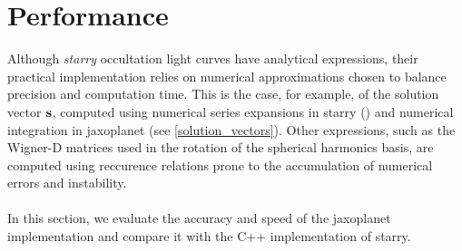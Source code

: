 \documentclass[modern]{aastex631}
\begin{document}
\newpage
\section{Performance}\label{performances}
Although \textit{starry} occultation light curves have analytical expressions, their practical implementation relies on numerical approximations chosen to balance precision and computation time. This is the case, for example, of the solution vector ${\mathbf{s}}$, computed using numerical series expansions in \textsf{starry} (\citealt[section D.2.3]{starry}) and numerical integration in \textsf{jaxoplanet} (see \autoref{solution_vectors}). Other expressions, such as the Wigner-D matrices used in the rotation of the spherical harmonics basis, are computed using reccurence relations prone to the accumulation of numerical errors and instability.\\\\
In this section, we evaluate the accuracy and speed of the \textsf{jaxoplanet} implementation and compare it with the C++ implementation of \textsf{starry}.
\end{document}
